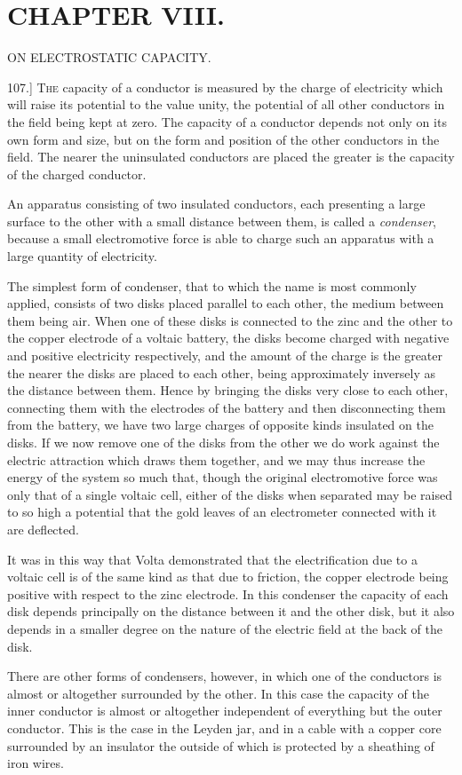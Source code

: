 \documentclass[12pt,oneside]{book}[2021/10/04]
\newcommand{\Heading}{\centering\normalfont}
\newcommand{\Chapter}[1]{\section*{\large\Heading #1}}
\newcommand{\Subheading}[1]{\begin{center}\small #1 \end{center}}
\newcommand{\article}[1]{\phantomsection \label{art:#1}{#1.]}}
\newcommand{\¬}{\hphantom{0}}
\newcommand{\newchapter}{\newpage\thispagestyle{empty}}
\begin{document}
\newchapter
\Chapter{CHAPTER VIII.}
\Subheading{ON ELECTROSTATIC CAPACITY.}

\article{107} \textsc{The} capacity of a conductor is measured by the charge of
electricity which will raise its potential to the value unity, the
potential of all other conductors in the field being kept at zero.
The capacity of a conductor depends not only on its own form and
size, but on the form and position of the other conductors in the
field. The nearer the uninsulated conductors are placed the greater
is the capacity of the charged conductor.

An apparatus consisting of two insulated conductors, each presenting
a large surface to the other with a small distance between
them, is called a \textit{condenser}, because a small electromotive force is
able to charge such an apparatus with a large quantity of electricity.

The simplest form of condenser, that to which the name is most
commonly applied, consists of two disks placed parallel to each
other, the medium between them being air. When one of these
disks is connected to the zinc and the other to the copper electrode
of a voltaic battery, the disks become charged with negative and
positive electricity respectively, and the amount of the charge is
the greater the nearer the disks are placed to each other, being
approximately inversely as the distance between them. Hence by
bringing the disks very close to each other, connecting them with
the electrodes of the battery and then disconnecting them from the
battery, we have two large charges of opposite kinds insulated on
the disks. If we now remove one of the disks from the other we
do work against the electric attraction which draws them together,
and we may thus increase the energy of the system so much that,
though the original electromotive force was only that of a single
voltaic cell, either of the disks when separated may be raised to so
high a potential that the gold leaves of an electrometer connected
with it are deflected.

It was in this way that Volta demonstrated that the electrification
due to a voltaic cell is of the same kind as that due to friction,
the copper electrode being positive with respect to the zinc electrode.
In this condenser the capacity of each disk depends principally
on the distance between it and the other disk, but it also
depends in a smaller degree on the nature of the electric field at
the back of the disk.

There are other forms of condensers, however, in which one of
the conductors is almost or altogether surrounded by the other.
In this case the capacity of the inner conductor is almost or altogether
independent of everything but the outer conductor. This is
the case in the Leyden jar, and in a cable with a copper core surrounded
by an insulator the outside of which is protected by a
sheathing of iron wires.
\end{document}
